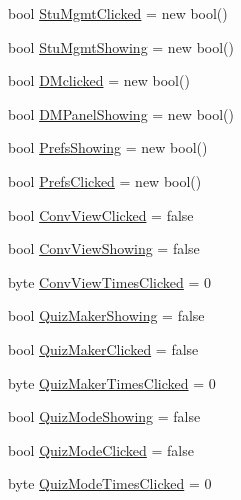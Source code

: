 \begin{DoxyCompactItemize}
\item 
bool \hyperlink{class_sr_p___classroom_inq_1_1frm_classrrom_inq_ad0a57ebb96913cfbb9622d8c4c7b52cb}{\-Stu\-Mgmt\-Clicked} = new bool()
\item 
bool \hyperlink{class_sr_p___classroom_inq_1_1frm_classrrom_inq_a6a40312dc72ead57d8d40d415ee14a07}{\-Stu\-Mgmt\-Showing} = new bool()
\item 
bool \hyperlink{class_sr_p___classroom_inq_1_1frm_classrrom_inq_a663c3385393ae39a41bd647632ba4617}{\-D\-Mclicked} = new bool()
\item 
bool \hyperlink{class_sr_p___classroom_inq_1_1frm_classrrom_inq_a7a4d3ad70d4284ad3f7d8ab3ca8718e0}{\-D\-M\-Panel\-Showing} = new bool()
\item 
bool \hyperlink{class_sr_p___classroom_inq_1_1frm_classrrom_inq_a915bf1ba42b54c697d1d90043610385f}{\-Prefs\-Showing} = new bool()
\item 
bool \hyperlink{class_sr_p___classroom_inq_1_1frm_classrrom_inq_a9e5a6ce376468f2e13dae9f60e86ccf6}{\-Prefs\-Clicked} = new bool()
\item 
bool \hyperlink{class_sr_p___classroom_inq_1_1frm_classrrom_inq_a567cf412a542927bb47984c0e835a7d2}{\-Conv\-View\-Clicked} = false
\item 
bool \hyperlink{class_sr_p___classroom_inq_1_1frm_classrrom_inq_a5b2fbbaa361339e096aa4be3f8e2b2dd}{\-Conv\-View\-Showing} = false
\item 
byte \hyperlink{class_sr_p___classroom_inq_1_1frm_classrrom_inq_a8b7285b1ee1626d8ebdc99d4bd6046a8}{\-Conv\-View\-Times\-Clicked} = 0
\item 
bool \hyperlink{class_sr_p___classroom_inq_1_1frm_classrrom_inq_a527e6e32ab67073ccbdb94297399ab2d}{\-Quiz\-Maker\-Showing} = false
\item 
bool \hyperlink{class_sr_p___classroom_inq_1_1frm_classrrom_inq_a80b43512315939f073e08cfea00ce796}{\-Quiz\-Maker\-Clicked} = false
\item 
byte \hyperlink{class_sr_p___classroom_inq_1_1frm_classrrom_inq_ae28b52f195f8e33470bb7bbc988ba622}{\-Quiz\-Maker\-Times\-Clicked} = 0
\item 
bool \hyperlink{class_sr_p___classroom_inq_1_1frm_classrrom_inq_a2be9d2ea6cc1cabf0dc6c6f3ee2544ce}{\-Quiz\-Mode\-Showing} = false
\item 
bool \hyperlink{class_sr_p___classroom_inq_1_1frm_classrrom_inq_af09c14bf56f313348d1e4a533fe515bf}{\-Quiz\-Mode\-Clicked} = false
\item 
byte \hyperlink{class_sr_p___classroom_inq_1_1frm_classrrom_inq_a0c88b881dc5ae86b5b3d5e04434b2ea8}{\-Quiz\-Mode\-Times\-Clicked} = 0

\end{DoxyCompactItemize}
